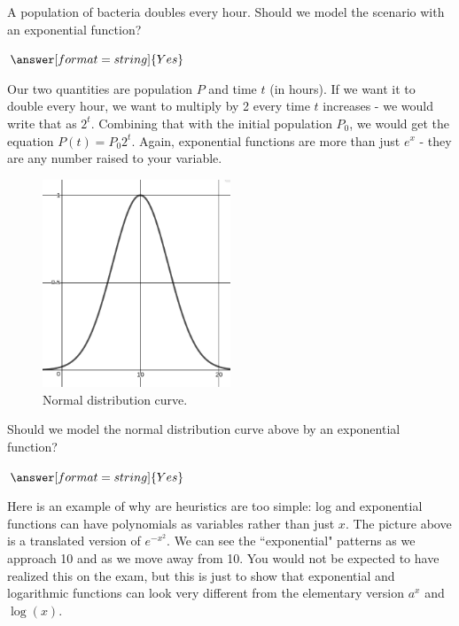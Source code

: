 \documentclass{ximera}
\begin{document}
\begin{question}
	A population of bacteria doubles every hour. Should we model the scenario with an exponential function?
	
	$\answer[format=string]{Yes}$
	
	\begin{feedback}
		Our two quantities are population $P$ and time $t$ (in hours). If we want it to double every hour, we want to multiply by 2 every time $t$ increases - we would write that as $2^t$. Combining that with the initial population $P_0$, we would get the equation $P(t) = P_0 2^t$. Again, exponential functions are more than just $e^x$ - they are any number raised to your variable.
	\end{feedback}
\end{question}

\begin{question}

\begin{figure}
	\includegraphics[width=0.5\textwidth]{expSquared.png}
	\caption{Normal distribution curve.}
\end{figure}

Should we model the normal distribution curve above by an exponential function?

$\answer[format=string]{Yes}$

\begin{feedback}
Here is an example of why are heuristics are too simple: log and exponential functions can have polynomials as variables rather than just $x$. The picture above is a translated version of $e^{-x^2}$. We can see the ``exponential" patterns as we approach 10 and as we move away from 10. You would not be expected to have realized this on the exam, but this is just to show that exponential and logarithmic functions can look very different from the elementary version $a^x$ and $\log(x)$.
\end{feedback}

\end{question}
\end{document}
